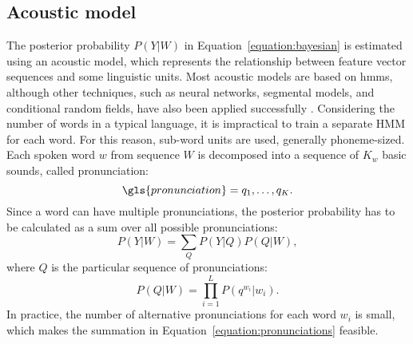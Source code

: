 \subsection{Acoustic model}
\label{subsection:acoustic}
The posterior probability $P(Y|W)$ in Equation~\ref{equation:bayesian} is estimated using an acoustic model, which represents the relationship between feature vector sequences and some linguistic units. Most acoustic models are based on \glspl{hmm}, although other techniques, such as neural networks, segmental models, and conditional random fields, have also been applied successfully \cite{yu2009hidden, yu2008maximum, mohamed2012acoustic}. Considering the number of words in a typical language, it is impractical to train a separate HMM for each word. For this reason, sub-word units are used, generally phoneme-sized. Each spoken word $w$ from sequence $W$ is decomposed into a sequence of $K_{w}$ basic sounds, called pronunciation:
\begin{equation}
  \gls{pronunciation}=q_{1}, \ldots, q_{K}.
\end{equation}
Since a word can have multiple pronunciations, the posterior probability has to be calculated as a sum over all possible pronunciations:
\begin{equation}
  \label{equation:pronunciations}
  P(Y|W) = \sum_{Q}P(Y|Q)P(Q|W),
\end{equation}
where $Q$ is the particular sequence of pronunciations:
\begin{equation}
  P(Q|W)=\prod_{i=1}^{L}P(q^{w_{i}}|w_{i}).
\end{equation}
In practice, the number of alternative pronunciations for each word $w_{i}$ is small, which makes the summation in Equation~\ref{equation:pronunciations} feasible.



